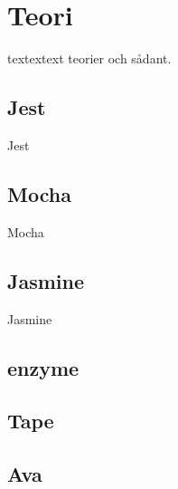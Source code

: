\section{Teori}
\label{sec:david-theory}
textextext teorier och sådant.

\subsection{Jest}
Jest

\subsection{Mocha}
Mocha

\subsection{Jasmine}
Jasmine

\subsection{enzyme}

\subsection{Tape}

\subsection{Ava}


